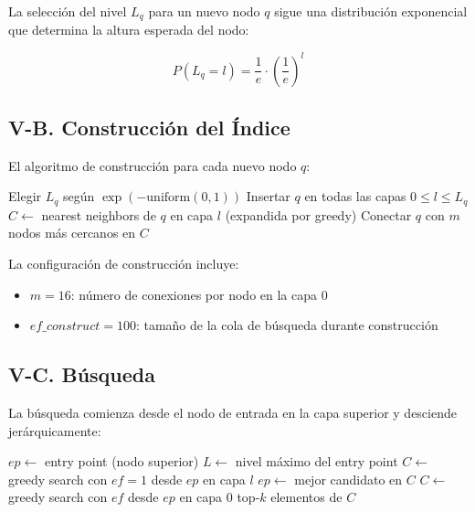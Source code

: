 \documentclass[conference]{IEEEtran}
\begin{document}
La selección del nivel $L_q$ para un nuevo nodo $q$ sigue una distribución exponencial que determina la altura esperada del nodo:

\begin{equation}
    P(L_q = l) = \frac{1}{e} \cdot \left(\frac{1}{e}\right)^l
    \label{eq:layer_distribution}
\end{equation}

\subsection{V-B. Construcción del Índice}

El algoritmo de construcción para cada nuevo nodo $q$:

\begin{algorithm}[H]
\caption{Construcción de HNSW}
\begin{algorithmic}
\State Elegir $L_q$ según $\exp(-\text{uniform}(0,1))$
\State Insertar $q$ en todas las capas $0 \leq l \leq L_q$
    \State $C \leftarrow$ nearest neighbors de $q$ en capa $l$ (expandida por greedy)
    \State Conectar $q$ con $m$ nodos más cercanos en $C$
\EndFor
\end{algorithmic}
\end{algorithm}

La configuración de construcción incluye:

\begin{itemize}
    \item $m = 16$: número de conexiones por nodo en la capa 0
    \item $ef\_construct = 100$: tamaño de la cola de búsqueda durante construcción
\end{itemize}

\subsection{V-C. Búsqueda}

La búsqueda comienza desde el nodo de entrada en la capa superior y desciende jerárquicamente:

\begin{algorithm}[H]
\caption{Búsqueda HNSW}
\begin{algorithmic}
\State $ep \leftarrow$ entry point (nodo superior)
\State $L \leftarrow$ nivel máximo del entry point
    \State $C \leftarrow$ greedy search con $ef=1$ desde $ep$ en capa $l$
    \State $ep \leftarrow$ mejor candidato en $C$
\EndFor
\State $C \leftarrow$ greedy search con $ef$ desde $ep$ en capa 0
\State \RETURN top-$k$ elementos de $C$
\end{algorithmic}
\end{algorithm}
\end{document}
